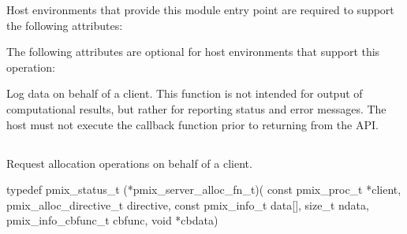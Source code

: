 
\divider

Host environments that provide this module entry point are required to support the following attributes:


\reqattrend

\optattrstart
The following attributes are optional for host environments that support this operation:


\optattrend

\descr

Log data on behalf of a client. This function is not intended for output of computational results, but rather for reporting status and error messages. The host must not execute the callback function prior to returning from the \ac{API}.


\subsection{}

\summary

Request allocation operations on behalf of a client.

\format

\cspecificstart
\begin{codepar}
typedef pmix_status_t (*pmix_server_alloc_fn_t)(
                             const pmix_proc_t *client,
                             pmix_alloc_directive_t directive,
                             const pmix_info_t data[], size_t ndata,
                             pmix_info_cbfunc_t cbfunc, void *cbdata)
\end{codepar}
\cspecificend

\begin{arglist}
\end{arglist}

